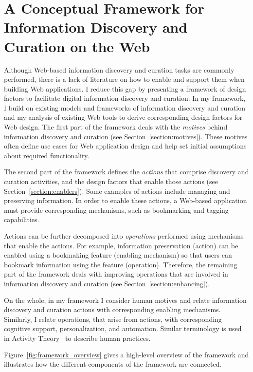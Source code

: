 \chapter{A Conceptual Framework for Information Discovery and Curation on the Web}
\label{chapter:framework}

Although Web-based information discovery and curation tasks are commonly performed, there is a lack of literature on how to enable and support them when building Web applications. I reduce this gap by presenting a framework of design factors to facilitate digital information discovery and curation. In my framework, I build on existing models and frameworks of information discovery and curation and my analysis of existing Web tools to derive corresponding design factors for Web design. The first part of the framework deals with the \textit{motives} behind information discovery and curation (see Section~\ref{section:motives}). These motives often define use cases for Web application design and help set initial assumptions about required functionality.

The second part of the framework defines the \textit{actions} that comprise discovery and curation activities, and the design factors that enable those actions (see Section~\ref{section:enablers}). Some examples of actions include managing and preserving information. In order to enable these actions, a Web-based application must provide corresponding mechanisms, such as bookmarking and tagging capabilities.

\pagebreak
Actions can be further decomposed into \textit{operations} performed using mechanisms that enable the actions. For example, information preservation (action) can be enabled using a bookmaking feature (enabling mechanism) so that users can bookmark information using the feature (operation). Therefore, the remaining part of the framework deals with improving operations that are involved in information discovery and curation (see Section~\ref{section:enhancing}).  

On the whole, in my framework I consider human motives and relate information discovery and curation actions with corresponding enabling mechanisms. Similarly, I relate operations, that arise from actions, with corresponding cognitive support, personalization, and automation.  Similar terminology is used in Activity Theory~\cite{kuutti1996activity} to describe human practices. 

Figure~\ref{fig:framework_overview} gives a high-level overview of the framework and illustrates how the different components of the framework are connected.

